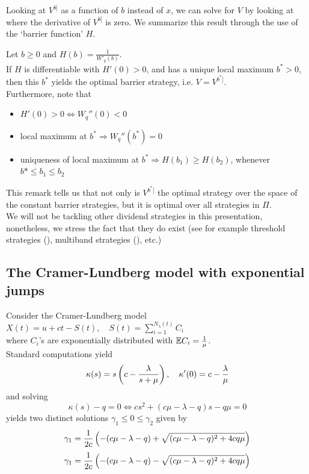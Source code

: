 Looking at $V^{b]}$ as a function of $b$ instead of $x$, we can solve for $V$ by looking at where the derivative of $V^{b]}$ is zero. We summarize this result through the use of the `barrier function' $H$.
\begin{rmk}
Let $b \geq 0$ and $H(b) = \frac{1}{W'_q (b)}$.\\
If $H$ is differentiable with $H'(0) > 0$, and has a unique local maximum $b^*>0$, then this $b^*$ yields the optimal barrier strategy, i.e. $V= V^{b^*]}$.\\
Furthermore, note that
\begin{itemize}
\item $H'(0) > 0 \iff W_q''(0)<0$
\item local maximum at $b^* \Rightarrow W_q''(b^*) =0$
\item uniqueness of local maximum at $b^* \Rightarrow H(b_1) \geq H(b_2)$, whenever $b* \leq b_1 \leq b_2$
\end{itemize}
\end{rmk}

This remark tells us that not only is $V^{b^*]}$ the optimal strategy over the space of the constant barrier strategies, but it is optimal over all strategies in $\Pi$.\\
\bigskip
We will not be tackling other dividend strategies in this presentation, nonetheless, we stress the fact that they do exist (see for example threshold strategies (\cite{gerber2004optimal}), multiband strategies (\cite{AM05}), etc.)

\subsection{The Cramer-Lundberg model with exponential jumps}
\label{CLexpo}

Consider the Cramer-Lundberg model $ X(t) = u + ct - S(t), \quad S(t) = \sum_{i=1}^{N_\lambda (t)} C_i $\\
where $C_i$'s are exponentially distributed with $\mathbb{E} C_i = \frac{1}{\mu}$.\\
\bigskip
Standard computations yield
\[
\kappa(s)= s \left( c- \frac{\lambda}{s + \mu} \right), \quad \kappa'(0) = c - \frac{\lambda}{\mu}
\]
and solving
\[
\kappa(s)-q = 0 \iff cs^2 + (c\mu -\lambda -q ) s -q\mu = 0
\]
yields two distinct solutions $\gamma_1 \leq 0 \leq \gamma_2$ given by
\[
\gamma_1 = \frac{1}{2c} \left( -(c\mu -\lambda -q ) + \sqrt{ (c\mu -\lambda -q )^2 + 4 c q\mu} \right)
\]
\[
\gamma_1 = \frac{1}{2c} \left( -(c\mu -\lambda -q ) - \sqrt{ (c\mu -\lambda -q )^2 + 4 c q\mu} \right)
\]

